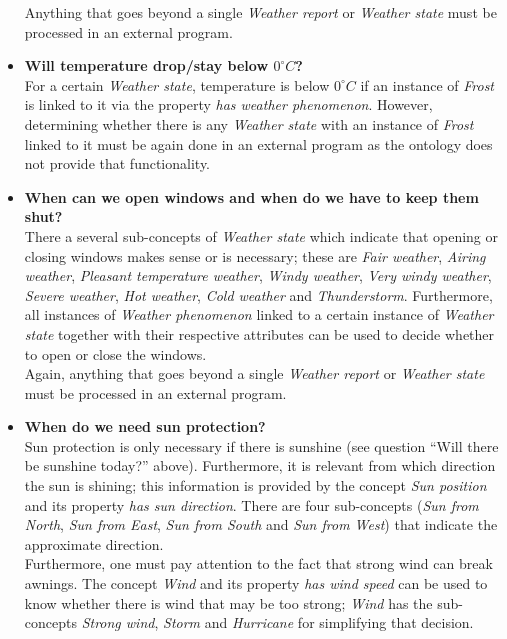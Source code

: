 \begin{itemize}
    Anything that goes beyond a single \emph{Weather report} or \emph{Weather state} must be processed in an external program.
  \item \textbf{Will temperature drop/stay below $0^\circ C$?}\\
    For a certain \emph{Weather state}, temperature is below $0^\circ C$ if an instance of \emph{Frost} is linked to it via the property \emph{has weather phenomenon}. However, determining whether there is any \emph{Weather state} with an instance of \emph{Frost} linked to it must be again done in an external program as the \thinkhomeweather ontology does not provide that functionality.
  \item \textbf{When can we open windows and when do we have to keep them shut?}\\ %
    There a several sub-concepts of \emph{Weather state} which indicate that opening or closing windows makes sense or is necessary; these are \emph{Fair weather}, \emph{Airing weather}, \emph{Pleasant temperature weather}, \emph{Windy weather}, \emph{Very windy weather}, \emph{Severe weather}, \emph{Hot weather}, \emph{Cold weather} and \emph{Thunderstorm}. Furthermore, all instances of \emph{Weather phenomenon} linked to a certain instance of \emph{Weather state} together with their respective attributes can be used to decide whether to open or close the windows.\\
    Again, anything that goes beyond a single \emph{Weather report} or \emph{Weather state} must be processed in an external program.
  \item \textbf{When do we need sun protection?}\\
    Sun protection is only necessary if there is sunshine (see question ``Will there be sunshine today?'' above). Furthermore, it is relevant from which direction the sun is shining; this information is provided by the concept \emph{Sun position} and its property \emph{has sun direction}. There are four sub-concepts (\emph{Sun from North}, \emph{Sun from East}, \emph{Sun from South} and \emph{Sun from West}) that indicate the approximate direction.\\
    Furthermore, one must pay attention to the fact that strong wind can break awnings. The concept \emph{Wind} and its property \emph{has wind speed} can be used to know whether there is wind that may be too strong; \emph{Wind} has the sub-concepts \emph{Strong wind}, \emph{Storm} and \emph{Hurricane} for simplifying that decision.\\

\end{itemize}
